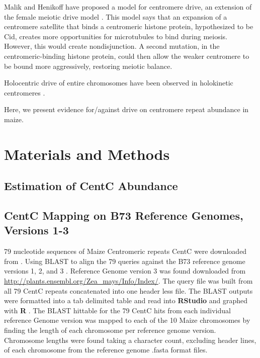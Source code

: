 \documentclass[12pt]{article}
\begin{document}

Malik and Henikoff have proposed a model for centromere drive, an extension of the female meiotic drive model \cite{Henikoff2001}. This model says that an expansion of a centromere satellite that binds a centromeric histone protein, hypothesized to be Cid, creates more opportunities for microtubules to bind during meiosis.  However, this would create nondisjunction.  A second mutation, in the centromeric-binding histone protein, could then allow the weaker centromere to be bound more aggressively, restoring meiotic balance.  %

Holocentric drive of entire chromosomes have been observed in holokinetic centromeres \cite{Bures2014}. 


Here, we present evidence for/against drive on centromere repeat abundance in maize.     

\section{Materials and Methods}

\subsection{Estimation of CentC Abundance} %

\subsection{CentC Mapping on B73 Reference Genomes, Versions 1-3} %

79 nucleotide sequences of Maize Centromeric repeats CentC were downloaded from \cite{ncbi nucleotide database}. Using BLAST to align the 79 queries against the B73 reference genome versions 1, 2, and 3 \cite{MaizeGDB} \cite{BLAST}. Reference Genome version 3 was found downloaded from  \url{http://plants.ensembl.org/Zea_mays/Info/Index/}. The query file was built from all 79 CentC repeats concatenated into one header less file. The BLAST outputs were formatted into a tab delimited table and read into {\bf RStudio} and graphed with {\bf R} \cite{R} \cite{RStudio}. The BLAST hittable for the 79 CentC hits from each individual reference Genome version was mapped to each of the 10 Maize chromosomes by finding the length of each chromosome per reference genome version. Chromosome lengths were found taking a character count, excluding header lines, of each chromosome from the reference genome .fasta format files. 
\end{document}
